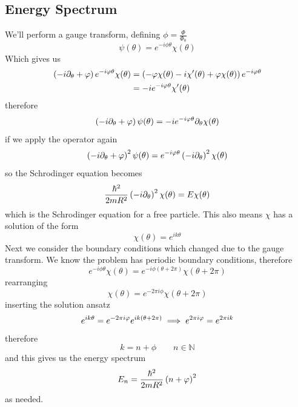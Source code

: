 \subsection{Energy Spectrum}
We'll perform a gauge transform, defining \(\phi = \frac{\Phi}{\Phi_0}\)
\begin{equation}
	\psi(\theta) = e^{-i\phi\theta}\chi(\theta)
\end{equation}
Which gives us
\begin{align}
	\left(-i\partial_\theta+\varphi\right) e^{-i\varphi\theta}\chi(\theta) &= \left(-\varphi\chi(\theta) - i\chi'(\theta)+\varphi\chi(\theta)\right)e^{-i\varphi\theta} \\
	&= -ie^{-i\varphi\theta}\chi'(\theta)
\end{align}
therefore
\begin{equation}
	\left(-i\partial_\theta+\varphi\right) \psi(\theta) = -ie^{-i\varphi\theta}\partial_\theta \chi(\theta)
\end{equation}
if we apply the operator again
\begin{equation}
	\left(-i\partial_\theta+\varphi\right)^2 \psi(\theta) = e^{-i\varphi\theta}\left(-i\partial_\theta\right)^2 \chi(\theta)
\end{equation}
so the Schrodinger equation becomes
\begin{equation}
	\frac{\hbar^2}{2mR^2}\left(-i\partial_\theta\right)^2 \chi(\theta) = E\chi(\theta)
\end{equation}
which is the Schrodinger equation for a free particle. This also means \(\chi\) has a solution of the form
\begin{equation}
	\chi(\theta) = e^{ik\theta}
\end{equation}
Next we consider the boundary conditions which changed due to the gauge transform. We know the problem has periodic boundary conditions, therefore
\begin{equation}
	e^{-i\phi\theta}\chi(\theta) = e^{-i\phi(\theta+2\pi)}\chi(\theta+2\pi)
\end{equation}
rearranging
\begin{equation}
	\chi(\theta) = e^{-2\pi i \phi}\chi(\theta+2\pi)
\end{equation}
inserting the solution ansatz
\begin{equation}
	e^{ik\theta} = e^{-2\pi i \varphi} e^{ik\left(\theta+2\pi\right)} \implies e^{2\pi i \varphi} = e^{2\pi i k}
\end{equation}
therefore
\begin{equation}
	k = n + \phi \qquad n \in \mathds{N}
\end{equation}
and this gives us the energy spectrum
\begin{equation}\label{energylevels}
	E_n = \frac{\hbar^2}{2mR^2}\left(n+\varphi\right)^2
\end{equation}
as needed.
